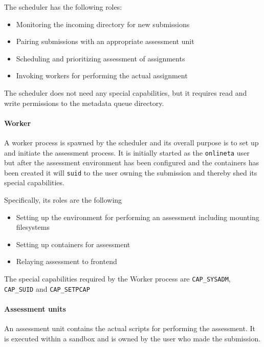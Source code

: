 The scheduler has the following roles:
\begin{itemize}
\item Monitoring the incoming directory for new submissions
\item Pairing submissions with an appropriate assessment unit
\item Scheduling and prioritizing assessment of assignments
\item Invoking workers for performing the actual assignment
\end{itemize}

The scheduler does not need any special capabilities, but it requires
read and write permissions to the metadata queue directory.


\paragraph{Worker}
A worker process is spawned by the scheduler and its overall purpose
is to set up and initiate the assessment process. It is initially
started as the \texttt{onlineta} user but after the assessment
environment has been configured and the containers has been created it
will \texttt{suid} to the user owning the submission and thereby shed its special
capabilities.

Specifically, its roles are the following
\begin{itemize}
\item Setting up the environment for performing an assessment
  including mounting filesystems
\item Setting up containers for assessment
\item Relaying assessment to frontend
\end{itemize}

The special capabilities required by the Worker process are
\texttt{CAP\_SYSADM}, \texttt{CAP\_SUID} and \texttt{CAP\_SETPCAP}

\paragraph{Assessment units}
An assessment unit contains the actual scripts for performing the
assessment. It is executed within a sandbox and is owned by the user
who made the submission.


